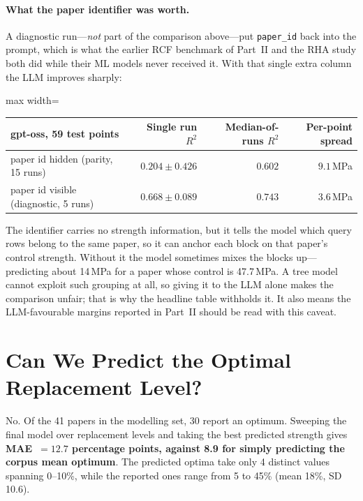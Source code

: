 \documentclass[11pt]{article}
\newcommand{\R}{$R^2$}
\begin{document}
\paragraph{What the paper identifier was worth.} A diagnostic run---\emph{not} part of the
comparison above---put \texttt{paper\_id} back into the prompt, which is what the earlier
RCF benchmark of Part~II and the RHA study both did while their ML models never received
it. With that single extra column the LLM improves sharply:

\begin{center}\small
\begin{adjustbox}{max width=\linewidth}
\begin{tabular}{lrrr}
\toprule
gpt-oss, 59 test points & Single run \R{} & Median-of-runs \R{} & Per-point spread \\
\midrule
paper id hidden (parity, 15 runs) & $0.204\pm0.426$ & $0.602$ & $9.1$\,MPa \\
paper id visible (diagnostic, 5 runs) & $0.668\pm0.089$ & $0.743$ & $3.6$\,MPa \\
\bottomrule
\end{tabular}
\end{adjustbox}
\end{center}

\noindent The identifier carries no strength information, but it tells the model which
query rows belong to the same paper, so it can anchor each block on that paper's control
strength. Without it the model sometimes mixes the blocks up---predicting about 14\,MPa
for a paper whose control is 47.7\,MPa. A tree model cannot exploit such grouping at all,
so giving it to the LLM alone makes the comparison unfair; that is why the headline table
withholds it. It also means the LLM-favourable margins reported in Part~II should be read
with this caveat.

\section{Can We Predict the Optimal Replacement Level?}
\label{sec:rcf-p3-opt}
No. Of the 41 papers in the modelling set, 30 report an optimum. Sweeping the final model
over replacement levels and taking the best predicted strength gives
\textbf{MAE~$=12.7$ percentage points, against 8.9 for simply predicting the corpus mean
optimum}. The predicted optima take only 4 distinct values spanning 0--10\%, while the
reported ones range from 5 to 45\% (mean 18\%, SD 10.6).
\end{document}
